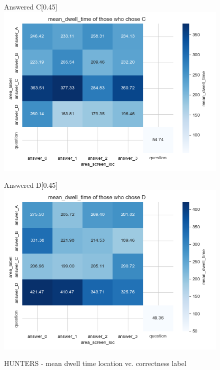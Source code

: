 \documentclass{article}
\begin{document}
\begin{figure}[H]
  \vspace{1em} %

  \begin{subcaptionbox}{Answered C\label{fig:C_dt_h}}[0.45\textwidth]
    {\centering\includegraphics[width=\linewidth]{plots/matrix_plots/matrix_mean_dwell_time_C_hunters.png}}
  \end{subcaptionbox}
  \hfill
  \begin{subcaptionbox}{Answered D\label{fig:D_dt_h}}[0.45\textwidth]
    {\centering\includegraphics[width=\linewidth]{plots/matrix_plots/matrix_mean_dwell_time_D_hunters.png}}
  \end{subcaptionbox}
  
  \caption{HUNTERS - mean dwell time location vc. correctness label}
  \label{fig:fourimages3}
\end{figure}
\end{document}
